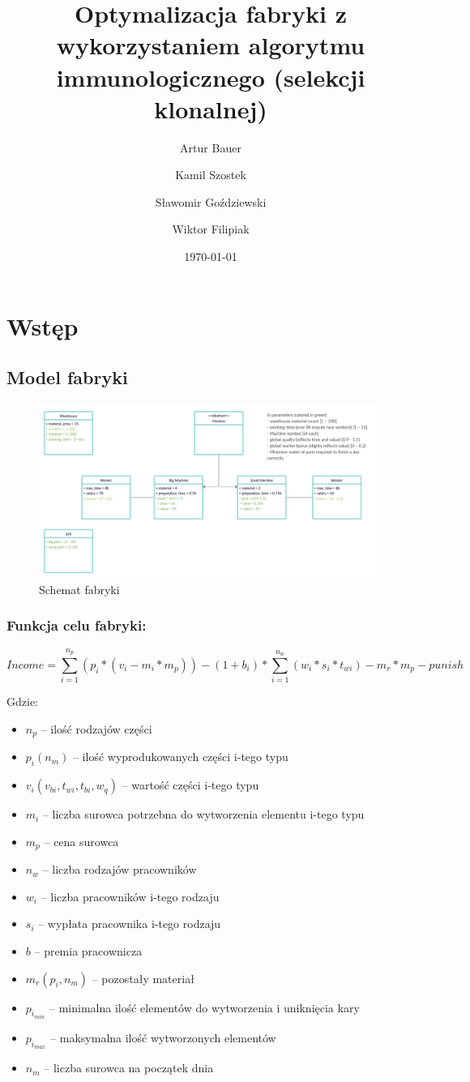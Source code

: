 \documentclass[a4paper]{article}
\title{Optymalizacja fabryki z wykorzystaniem algorytmu immunologicznego (selekcji klonalnej)}
\author{Artur Bauer \and Kamil Szostek \and Sławomir Goździewski \and Wiktor Filipiak}
\date{\today}
\begin{document}


\tableofcontents

\newpage
\section{Wstęp}
\subsection{Model fabryki}\label{factory}

\begin{figure}[ht]
\centering
\includegraphics[width=.7\textwidth]{Factory_scheme.png}
\caption{Schemat fabryki}
\end{figure}

\subsubsection{Funkcja celu fabryki:}\label{factory-main-goal-function}

$$Income = \sum^{n_p}_{i=1}(p_i*(v_i-m_i*m_p)) - (1+b_i)*\sum^{n_w}_{i = 1}(w_i*s_i *t_{wi}) - m_r*m_p - punish$$

Gdzie:
\begin{itemize}
    \item $n_p$ -- ilość rodzajów części
    \item $p_i (n_m)$ -- ilość wyprodukowanych części i-tego typu
    \item $v_i(v_{bi}, t_{wi},t_{bi},w_q)$ -- wartość części i-tego typu
    \item $m_i$ -- liczba surowca potrzebna do wytworzenia elementu i-tego typu
    \item $m_p$ -- cena surowca
    \item $n_w$ -- liczba rodzajów pracowników
    \item $w_i$ -- liczba pracowników i-tego rodzaju
    \item $s_i$ -- wypłata pracownika i-tego rodzaju
    \item $b$ -- premia pracownicza
    \item $m_r(p_i,n_m)$ -- pozostały materiał
    \item $p_{i_{min}}$ -- minimalna ilość elementów do wytworzenia i uniknięcia kary
    \item $p_{i_{max}}$ -- maksymalna ilość wytworzonych elementów
    \item $n_m$ -- liczba surowca na początek dnia
\end{itemize}
\end{document}
